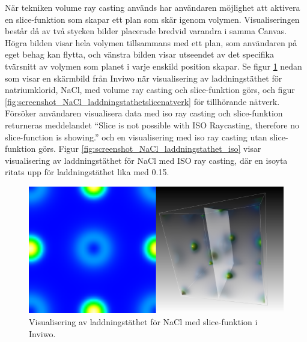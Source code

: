 \documentclass[a4paper,12pt]{article}
\begin{document}
När tekniken volume ray casting
används har användaren möjlighet att 
aktivera en slice-funktion som skapar
ett plan som skär
igenom volymen. 
Visualiseringen består då av två stycken bilder placerade 
bredvid varandra i samma Canvas.
Högra bilden visar hela volymen tillsammans med ett plan, som användaren på eget behag kan flytta, och 
vänstra bilden visar utseendet av det specifika tvärsnitt av volymen som planet i varje enskild position 
skapar. 
Se figur \ref{fig:screenshot_NaCl_laddningstathetslice} nedan som visar en skärmbild från Inviwo 
när visualisering av laddningstäthet för natriumklorid, NaCl,
med volume ray casting
och slice-funktion görs, och figur \ref{fig:screenshot_NaCl_laddningstathetslicenatverk} för tillhörande nätverk. Försöker användaren visualisera data 
med iso ray casting och slice-funktion returneras meddelandet ``Slice is not possible with ISO 
Raycasting, therefore no slice-function is showing.” och en visualisering med iso ray casting utan slice-funktion görs. Figur \ref{fig:screenshot_NaCl_laddningstathet_iso} visar visualisering av laddningstäthet för NaCl med ISO ray casting, där en isoyta ritats upp för laddningstäthet lika med 0.15.

\begin{figure} [H]
\centering
\includegraphics[scale=0.25]{screenshot_NaCl_laddningstathetslice.png}
\caption{Visualisering av laddningstäthet för NaCl med slice-funktion i Inviwo.}
\label{fig:screenshot_NaCl_laddningstathetslice}
\end{figure}
\end{document}
